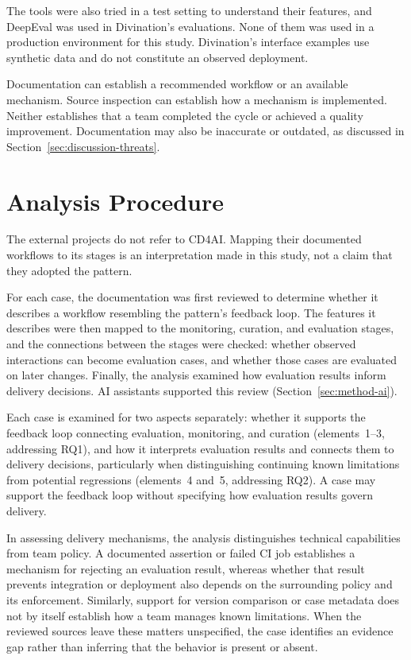 The tools were also tried in a test setting to understand their features,
and DeepEval was used in Divination's evaluations. None of them was used in a
production environment for this study. Divination's interface examples use
synthetic data and do not constitute an observed deployment.

Documentation can establish a recommended workflow or an available mechanism.
Source inspection can establish how a mechanism is implemented. Neither
establishes that a team completed the cycle or achieved a quality improvement.
Documentation may also be inaccurate or outdated, as discussed in
Section~\ref{sec:discussion-threats}.

\section{Analysis Procedure}
\label{sec:method-analysis}

The external projects do not refer to CD4AI. Mapping their documented workflows
to its stages is an interpretation made in this study, not a claim that they
adopted the pattern.

For each case, the documentation was first reviewed to determine whether it
describes a workflow resembling the pattern's feedback loop. The features it
describes were then mapped to the monitoring, curation, and evaluation stages,
and the connections between the stages were checked: whether observed
interactions can become evaluation cases, and whether those cases are evaluated
on later changes. Finally, the analysis examined how evaluation results inform
delivery decisions. AI assistants supported this review
(Section~\ref{sec:method-ai}).

Each case is examined for two aspects separately: whether it supports the
feedback loop connecting evaluation, monitoring, and curation (elements~1--3,
addressing RQ1), and how it interprets evaluation results and connects them to
delivery decisions, particularly when distinguishing continuing known
limitations from potential regressions (elements~4 and~5, addressing RQ2). A
case may support the feedback loop without specifying how evaluation results
govern delivery.

In assessing delivery mechanisms, the analysis distinguishes technical
capabilities from team policy. A documented assertion or failed CI job
establishes a mechanism for rejecting an evaluation result, whereas whether
that result prevents integration or deployment also depends on the surrounding
policy and its enforcement. Similarly, support for version comparison or case
metadata does not by itself establish how a team manages known limitations.
When the reviewed sources leave these matters unspecified, the case identifies
an evidence gap rather than inferring that the behavior is present or absent.

